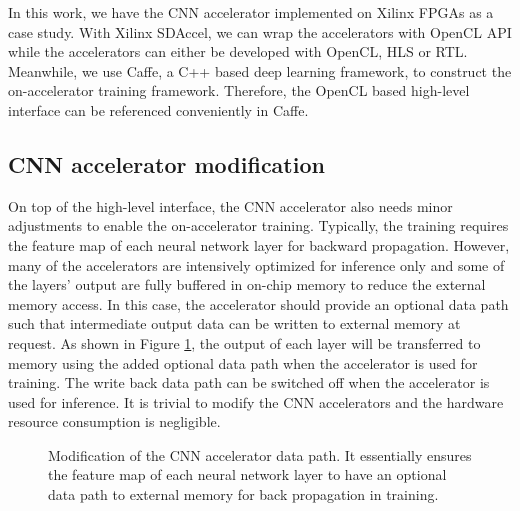 In this work, we have the CNN accelerator implemented on Xilinx FPGAs as a case study. 
With Xilinx SDAccel, we can wrap the accelerators with OpenCL API while the accelerators 
can either be developed with OpenCL, HLS or RTL. Meanwhile, we use Caffe, a C++ based 
deep learning framework, to construct the on-accelerator training framework. Therefore, 
the OpenCL based high-level interface can be referenced conveniently in Caffe. 



\subsection{CNN accelerator modification}
On top of the high-level interface, the CNN accelerator also needs 
minor adjustments to enable the on-accelerator training. 
Typically, the training requires the feature map of each neural 
network layer for backward propagation. However, many of the accelerators 
are intensively optimized for inference only and some of the layers’ output 
are fully buffered in on-chip memory to reduce the external memory access. 
In this case, the accelerator should provide an optional data path such that 
intermediate output data can be written to external memory at request.
As shown in Figure \ref{fig:change_of_accelerator}, the output of each layer 
will be transferred to memory using the added optional data path 
when the accelerator is used for training. The write back data path 
can be switched off when the accelerator is used for inference. 
It is trivial to modify the CNN accelerators and the hardware
resource consumption is negligible.

\begin{figure}
        \caption{Modification of the CNN accelerator data path. It essentially
ensures the feature map of each neural network layer to have an optional data path 
to external memory for back propagation in training.}
        \label{fig:change_of_accelerator}
        \vspace{-1em}
\end{figure}


